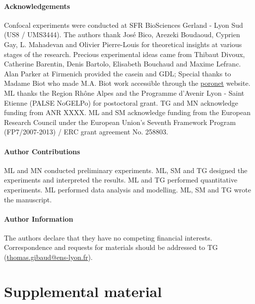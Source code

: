 \documentclass[twocolumn,superscriptaddress,showpacs,preprintnumbers,
amsmath,amssymb,prl]{revtex4-1}
\begin{document}
\paragraph*{Acknowledgements}
Confocal experiments were conducted at SFR BioSciences Gerland - Lyon Sud (US8 / UMS3444).
The authors thank José Bico, Arezeki Boudaoud, Cyprien Gay, L. Mahadevan and Olivier Pierre-Louis for theoretical insights at various stages of the research. 
Precious experimental ideas came from Thibaut Divoux, Catherine Barentin, Denis Bartolo, Elisabeth Bouchaud and Maxime Lefranc.
Alan Parker at Firmenich provided the casein and GDL; 
Special thanks to Madame Biot who made M.A. Biot work accessible through the \href{http://www.olemiss.edu/sciencenet/poronet/}{poronet} website. 
ML thanks the Region Rhône Alpes and the Programme d'Avenir Lyon - Saint Etienne (PALSE NoGELPo) for postoctoral grant. 
TG and MN acknowledge funding from ANR XXXX. 
ML and SM acknowledge funding from the European Research Council under the European Union's Seventh Framework Program (FP7/2007-2013) / ERC grant agreement No. 258803.


\paragraph*{Author Contributions}
ML and MN conducted preliminary experiments. ML, SM and TG designed the experiments and interpreted the results. ML and TG performed quantitative experiments. ML performed data analysis and modelling. ML, SM and TG wrote the manuscript.


\paragraph*{Author Information} 
The authors declare that they have no competing financial interests. 
Correspondence and requests for materials should be addressed to TG (\href{mailto:thomas.gibaud@ens-lyon.fr}{thomas.gibaud@ens-lyon.fr}).


\clearpage
\newpage
\setcounter{figure}{0}

\section*{Supplemental material}
\end{document}
